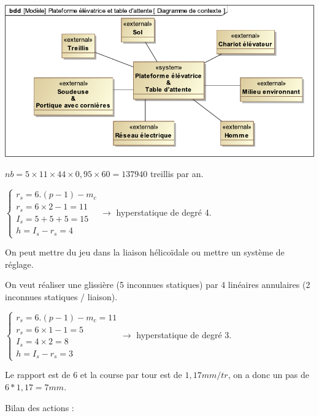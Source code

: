 
\begin{center}
\includegraphics[width=0.95\linewidth]{img/Diagramme_de_contexte}
\end{center}


$nb=5\times11\times44\times0,95\times60=137940$ treillis par an.


$\left\{\begin{array}{l}
r_s = 6.(p-1)- m_c \\
r_s = 6\times 2 - 1 = 11 \\
I_s = 5 + 5 + 5 = 15 \\
h=I_s-r_s = 4\end{array}\right. \rightarrow$ hyperstatique de degré 4.


On peut mettre du jeu dans la liaison hélicoïdale ou mettre un système de réglage.


On veut réaliser une glissière (5 inconnues statiques) par 4 linéaires annulaires (2 inconnues
statiques / liaison).

$\left\{\begin{array}{l}
r_s = 6.(p-1)- m_c = 11 \\
r_s = 6\times 1 - 1 = 5 \\
I_s = 4\times 2 = 8 \\
h=I_s-r_s = 3\end{array}\right. \rightarrow$ hyperstatique de degré 3.


Le rapport est de $6$ et la course par tour est de $1,17mm/tr$, on a donc un pas de $6*1,17=7mm$.


Bilan des actions :

